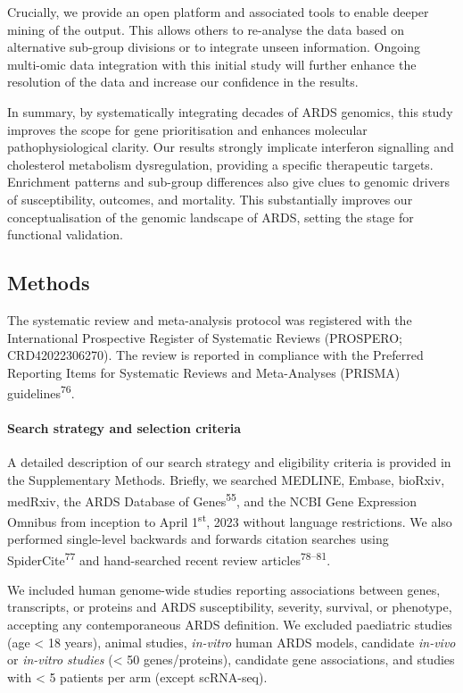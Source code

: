 \documentclass[
  11,
  a4paper,
]{article}
\let\oldparagraph\paragraph
\renewcommand{\paragraph}[1]{\oldparagraph{#1}\mbox{}}
\begin{document}
Crucially, we provide an open platform and associated tools to enable
deeper mining of the output. This allows others to re-analyse the data
based on alternative sub-group divisions or to integrate unseen
information. Ongoing multi-omic data integration with this initial study
will further enhance the resolution of the data and increase our
confidence in the results.

In summary, by systematically integrating decades of ARDS genomics, this
study improves the scope for gene prioritisation and enhances molecular
pathophysiological clarity. Our results strongly implicate interferon
signalling and cholesterol metabolism dysregulation, providing a
specific therapeutic targets. Enrichment patterns and sub-group
differences also give clues to genomic drivers of susceptibility,
outcomes, and mortality. This substantially improves our
conceptualisation of the genomic landscape of ARDS, setting the stage
for functional validation.

\newpage

\hypertarget{methods}{%
\subsection{Methods}\label{methods}}

The systematic review and meta-analysis protocol was registered with the
International Prospective Register of Systematic Reviews (PROSPERO;
CRD42022306270). The review is reported in compliance with the Preferred
Reporting Items for Systematic Reviews and Meta-Analyses (PRISMA)
guidelines\textsuperscript{76}.

\hypertarget{search-strategy-and-selection-criteria}{%
\paragraph{Search strategy and selection
criteria}\label{search-strategy-and-selection-criteria}}

A detailed description of our search strategy and eligibility criteria
is provided in the Supplementary Methods. Briefly, we searched MEDLINE,
Embase, bioRxiv, medRxiv, the ARDS Database of
Genes\textsuperscript{55}, and the NCBI Gene Expression Omnibus from
inception to April 1\textsuperscript{st}, 2023 without language
restrictions. We also performed single-level backwards and forwards
citation searches using SpiderCite\textsuperscript{77} and hand-searched
recent review articles\textsuperscript{78--81}.

We included human genome-wide studies reporting associations between
genes, transcripts, or proteins and ARDS susceptibility, severity,
survival, or phenotype, accepting any contemporaneous ARDS definition.
We excluded paediatric studies (age \textless{} 18 years), animal
studies, \emph{in-vitro} human ARDS models, candidate \emph{in-vivo} or
\emph{in-vitro studies} (\textless{} 50 genes/proteins), candidate gene
associations, and studies with \textless{} 5 patients per arm (except
scRNA-seq).
\end{document}
